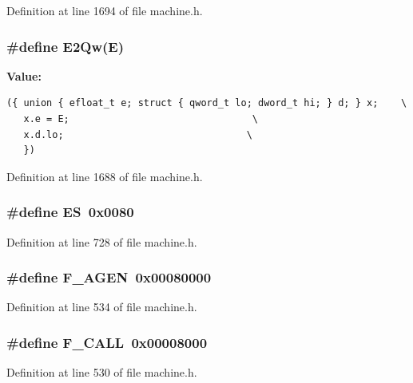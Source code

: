 Definition at line 1694 of file machine.h.
\subsubsection[{E2Qw}]{\setlength{\rightskip}{0pt plus 5cm}\#define E2Qw(E)}\label{machine_8h_ab6a3735e802d72da5a950cc6d745a70}


\textbf{Value:}

\begin{Code}\begin{verbatim}({ union { efloat_t e; struct { qword_t lo; dword_t hi; } d; } x;    \
   x.e = E;                                \
   x.d.lo;                                \
   })
\end{verbatim}
\end{Code}


Definition at line 1688 of file machine.h.
\subsubsection[{ES}]{\setlength{\rightskip}{0pt plus 5cm}\#define ES~0x0080}\label{machine_8h_403811204922acc8d200abb94fa62fe4}




Definition at line 728 of file machine.h.
\subsubsection[{F\_\-AGEN}]{\setlength{\rightskip}{0pt plus 5cm}\#define F\_\-AGEN~0x00080000}\label{machine_8h_552a74ebeb2ede9190804cbcca074879}




Definition at line 534 of file machine.h.
\subsubsection[{F\_\-CALL}]{\setlength{\rightskip}{0pt plus 5cm}\#define F\_\-CALL~0x00008000}\label{machine_8h_dc0a3b683ae2e72a812c4da20e899620}




Definition at line 530 of file machine.h.
